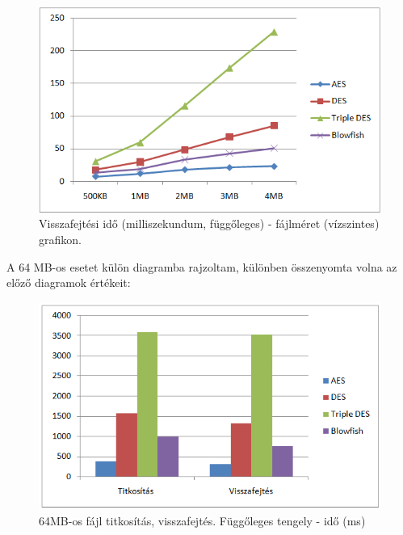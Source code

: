 \begin{figure}[h]
	\centering
	\includegraphics[scale=0.8]{images/alg_graf_2.png}
	\caption{Visszafejtési idő (milliszekundum, függőleges) - fájlméret (vízszintes) grafikon.}
	\label{fig:alg_visszafejtes_graf}
\end{figure}


\newpage \noindent  A 64 MB-os esetet külön diagramba rajzoltam, különben összenyomta volna az előző diagramok értékeit:
\begin{figure}[h]
	\centering
	\includegraphics[scale=0.8]{images/alg_graf_3.png}
	\caption{64MB-os fájl titkosítás, visszafejtés. Függőleges tengely - idő (ms)}
	\label{fig:alg_64mb_graf}
\end{figure}

